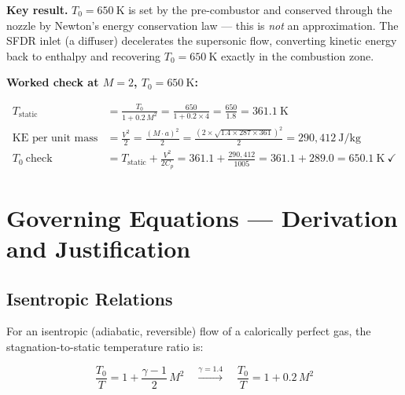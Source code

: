 \documentclass[12pt,a4paper]{report}
\begin{document}
\begin{infobox}
\textbf{Key result.}
$T_0 = 650\ \text{K}$ is set by the pre-combustor and conserved through the
nozzle by Newton's energy conservation law — this is \emph{not} an
approximation.  The SFDR inlet (a diffuser) decelerates the supersonic flow,
converting kinetic energy back to enthalpy and recovering $T_0 = 650\ \text{K}$
exactly in the combustion zone.
\end{infobox}

\medskip
\noindent\textbf{Worked check at $M=2$, $T_0=650\ \text{K}$:}

\begin{align}
  T_\text{static} &= \frac{T_0}{1 + 0.2\,M^2}
  = \frac{650}{1 + 0.2\times4} = \frac{650}{1.8} = 361.1\ \text{K}
  \label{eq:tstatic}\\[6pt]
  \text{KE per unit mass} &= \frac{V^2}{2}
  = \frac{(M\cdot a)^2}{2}
  = \frac{(2\times\sqrt{1.4\times287\times361})^2}{2}
  = 290{,}412\ \text{J/kg}
  \nonumber\\[6pt]
  T_0\ \text{check} &= T_\text{static} + \frac{V^2}{2C_p}
  = 361.1 + \frac{290{,}412}{1005} = 361.1 + 289.0 = 650.1\ \text{K}\ \checkmark
\end{align}

\chapter{Governing Equations — Derivation and Justification}

\section{Isentropic Relations}

For an isentropic (adiabatic, reversible) flow of a calorically perfect gas,
the stagnation-to-static temperature ratio is:

\begin{formulabox}
\begin{equation}
  \frac{T_0}{T} = 1 + \frac{\gamma-1}{2}\,M^2
  \quad\xrightarrow{\gamma=1.4}\quad
  \frac{T_0}{T} = 1 + 0.2\,M^2
  \label{eq:isentropic}
\end{equation}
\end{formulabox}
\end{document}
